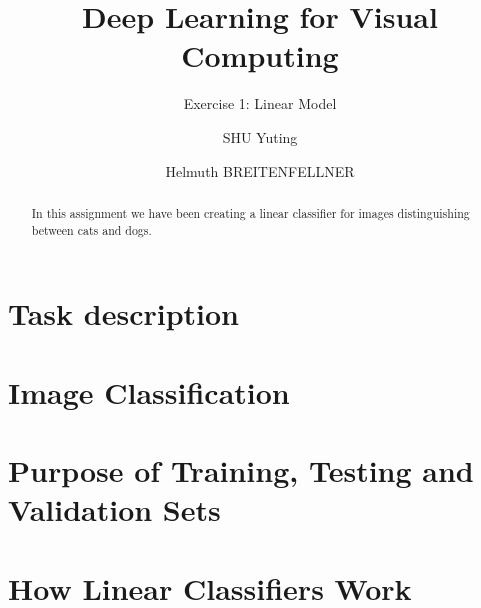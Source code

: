 \documentclass[sigconf,nonacm]{acmart}
\begin{document}
\title{Deep Learning for Visual Computing}
\subtitle{Exercise 1: Linear Model}
\author{SHU Yuting}
\author{Helmuth BREITENFELLNER}
\begin{abstract}
In this assignment we have been creating a linear classifier for images
distinguishing between cats and dogs.
\end{abstract}
\maketitle
\section{Task description}
\section{Image Classification}
\section{Purpose of Training, Testing and Validation Sets}
\section{How Linear Classifiers Work}


\end{document}
